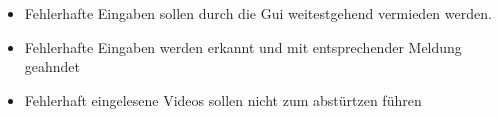 \documentclass[]{book}
\begin{document}
\begin{itemize}
\item Fehlerhafte Eingaben sollen durch die Gui weitestgehend vermieden werden.
\item Fehlerhafte Eingaben werden erkannt und mit entsprechender Meldung geahndet
\item Fehlerhaft eingelesene Videos sollen nicht zum abstürtzen führen

\end{itemize}
\end{document}
